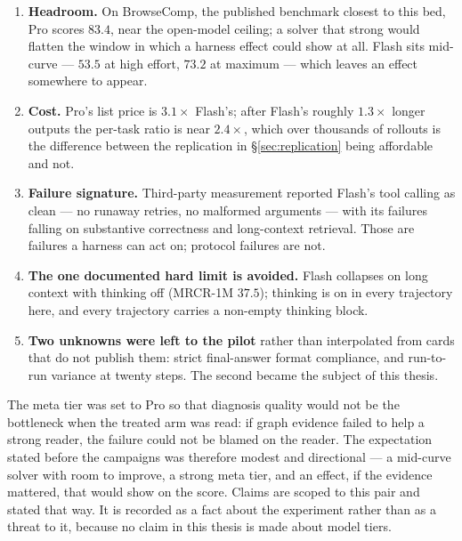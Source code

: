 \begin{enumerate}
  \item \textbf{Headroom.} On BrowseComp, the published benchmark closest
        to this bed, Pro scores $83.4$, near the open-model ceiling; a
        solver that strong would flatten the window in which a harness
        effect could show at all. Flash sits mid-curve --- $53.5$ at high
        effort, $73.2$ at maximum --- which leaves an effect somewhere to appear.
  \item \textbf{Cost.} Pro's list price is $3.1\times$ Flash's; after
        Flash's roughly $1.3\times$ longer outputs the per-task ratio is
        near $2.4\times$, which over thousands of rollouts is the
        difference between the replication in \S\ref{sec:replication}
        being affordable and not.
  \item \textbf{Failure signature.} Third-party measurement reported
        Flash's tool calling as clean --- no runaway retries, no malformed
        arguments --- with its failures falling on substantive correctness
        and long-context retrieval. Those are failures a harness can act
        on; protocol failures are not.
  \item \textbf{The one documented hard limit is avoided.} Flash collapses
        on long context with thinking off (MRCR-1M $37.5$); thinking is on
        in every trajectory here, and every trajectory carries a
        non-empty thinking block.
  \item \textbf{Two unknowns were left to the pilot} rather than
        interpolated from cards that do not publish them: strict
        final-answer format compliance, and run-to-run variance at twenty
        steps. The second became the subject of this thesis.
\end{enumerate}

The meta tier was set to Pro so that diagnosis quality would not be the
bottleneck when the treated arm was read: if graph evidence failed to help
a strong reader, the failure could not be blamed on the reader. The
expectation stated before the campaigns was therefore modest and
directional --- a mid-curve solver with room to improve, a strong meta
tier, and an effect, if the evidence mattered, that would show on the
score. Claims are scoped to this pair and stated that way. It is recorded
as a fact about the experiment rather than as a threat to it, because no
claim in this thesis is made about model tiers.

